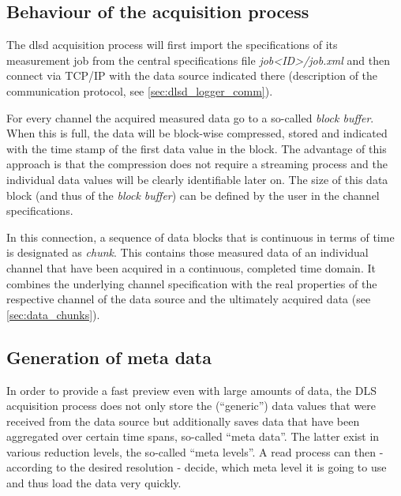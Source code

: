 \documentclass[a4paper,12pt,BCOR6mm,bibtotoc,idxtotoc]{scrbook}
\begin{document}

\subsection{Behaviour of the acquisition process} \label{sec:dlsd_logger_behaviour}

The dlsd acquisition process will first import the specifications of its
measurement job from the central specifications file
\textit{job\textless ID\textgreater/job.xml} and then connect via TCP/IP with
the data source indicated there (description of the communication protocol,
see \autoref{sec:dlsd_logger_comm}).

For every channel the acquired measured data go to a so-called \textit{block buffer}. When this is full, the data will be block-wise compressed, stored and indicated with the time stamp of the first data value in the block. The advantage of this approach is that the compression does not require a streaming process and the individual data values will be clearly identifiable later on. The size of this data block (and thus of the \textit{block buffer}) can be defined by the user in the channel specifications.

In this connection, a sequence of data blocks that is continuous in terms of
time is designated as \textit{chunk}. This contains
those measured data of an individual channel that have been acquired in a
continuous, completed time domain. It combines the underlying channel
specification with the real properties of the respective channel of the data
source and the ultimately acquired data (see \autoref{sec:data_chunks}).


\subsection{Generation of meta data} \label{sec:dlsd_data_meta}

In order to provide a fast preview even with large amounts of data, the DLS acquisition process does not only store the (``generic'') data values that were received from the data source but additionally saves data that have been aggregated over certain time spans, so-called ``meta data''. The latter exist in various reduction levels, the so-called ``meta levels''. A read process can then - according to the desired resolution - decide, which meta level it is going to use and thus load the data very quickly.
\end{document}

